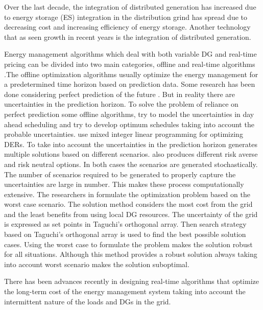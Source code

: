 
Over the last decade, the integration of distributed generation has increased due to 
energy storage (ES) integration in the distribution grind has spread due to decreasing cost  and increasing efficiency of energy storage. Another technology that as seen growth in  recent years is the integration of distributed generation.


Energy management algorithms which deal with both variable DG and real-time pricing can be divided into two main categories, offline and real-time algorithms \cite{rt_shi_2017}.The offline optimization algorithms usually optimize the energy management for a predetermined time horizon based on prediction data. Some research has been done considering perfect prediction of the future \cite{Off_1,off_2,off_3,off_4}. But in reality there are uncertainties in the prediction horizon. To solve the problem of reliance on perfect prediction some offline algorithms, try to model the uncertainties in day ahead scheduling and try to develop optimum schedules taking into account the probable uncertainties. \cite{ous_1,ous_2} use mixed integer linear programming for optimizing DERs. To take into account the uncertainties in the prediction horizon \cite{ous_2} generates multiple solutions based on different scenarios. \cite{ous_1} also produces different risk averse and risk neutral options. In both cases the scenarios are generated stochastically. The number of scenarios required to be generated to properly capture the uncertainties are large in number. This makes these process computationally extensive. The researchers in \cite{ous_3} formulate the optimization problem based on the worst case scenario. The solution method considers the most cost from the grid and the least benefits from using local DG resources. The uncertainty of the grid is expressed as set points in Taguchi’s orthogonal array. Then search strategy based on Taguchi’s orthogonal array is used to find the best possible solution cases. Using the worst case to formulate the problem makes the solution robust for all situations. Although this method provides a robust solution always taking into account worst scenario makes the solution suboptimal. 

There has been advances recently in designing real-time algorithms that optimize the long-term cost of the energy management system taking into account the intermittent nature of the loads and DGs in the grid. 


